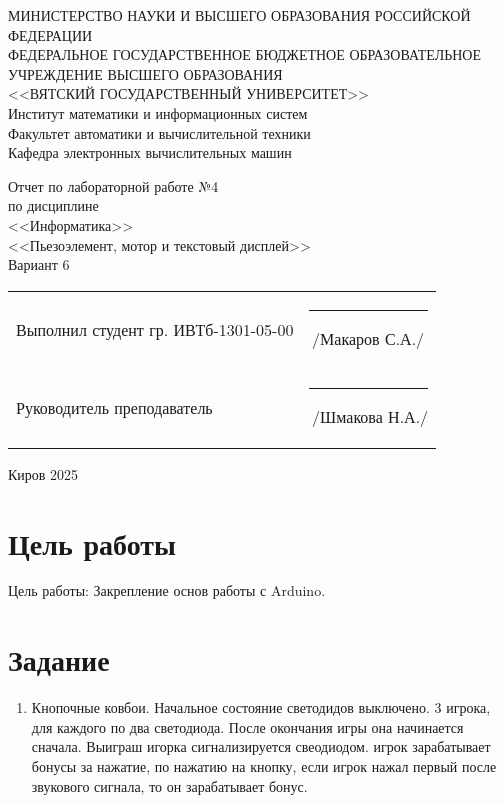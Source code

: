 \documentclass[a4paper,14pt]{extarticle}
\begin{document}
  \newpage\thispagestyle{empty}
  \begin{center}
    \MakeUppercase{
      Министерство науки и высшего образования Российской Федерации\\
      Федеральное государственное бюджетное образовательное учреждение высшего образования\\
      <<Вятский Государственный Университет>>\\
    }
    Институт математики и информационных систем\\
    Факультет автоматики и вычислительной техники\\
    Кафедра электронных вычислительных машин
  \end{center}
  \vfill

  \begin{center}
    Отчет по лабораторной работе №4\\
    по дисциплине\\
    <<Информатика>>\\
    <<Пьезоэлемент, мотор и текстовый дисплей>>\\
    Вариант 6
  \end{center}
  \vfill

  \noindent
  \begin{tabular}{ll}
    Выполнил студент гр. ИВТб-1301-05-00 \hspace{5mm} & \rule[-1mm]{25mm}{0.10mm}\,/Макаров С.А./ \\
    Руководитель преподаватель & \rule[-1mm]{25mm}{0.10mm}\,/Шмакова Н.А./ \\
  \end{tabular}

  \vfill
  \begin{center}
    Киров 2025
  \end{center}

  \newpage
  \section*{\hspace{12.5mm}Цель работы}
  Цель работы: Закрепление основ работы с Arduino.

  \section*{\hspace{12.5mm}Задание}
  \begin{enumerate}
    \item Кнопочные ковбои. Начальное состояние светодидов выключено. 3 игрока, для каждого по два светодиода. После окончания игры она начинается сначала. Выиграш игорка сигнализируется свеодиодом. игрок зарабатывает бонусы за нажатие, по нажатию на кнопку, если игрок нажал первый после звукового сигнала, то он зарабатывает бонус.
  \end{enumerate}
\end{document}
